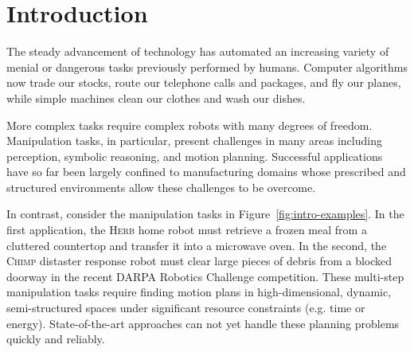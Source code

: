 \chapter{Introduction}

The steady advancement of technology
has automated an increasing variety of menial or dangerous tasks
previously performed by humans.
Computer algorithms now trade our stocks,
route our telephone calls and packages,
and fly our planes,
while simple machines clean our clothes and wash our dishes.

More complex tasks require complex robots with many
degrees of freedom.
Manipulation tasks, in particular,
present challenges in many areas including
perception, symbolic reasoning, and motion planning.
Successful applications have so far been largely
confined to manufacturing domains
whose prescribed and structured environments
allow these challenges to be overcome.

In contrast,
consider the manipulation tasks in Figure~\ref{fig:intro-examples}.
In the first application,
the \textsc{Herb} home robot must retrieve a frozen meal from 
a cluttered countertop
and transfer it into a microwave oven.
In the second,
the \textsc{Chimp} distaster response robot
must clear large pieces of debris from a blocked doorway
in the recent DARPA Robotics Challenge competition.
These multi-step manipulation tasks
require finding motion plans in
high-dimensional, dynamic, semi-structured spaces
under significant resource constraints (e.g. time or energy).
State-of-the-art approaches can not yet handle these
planning problems quickly and reliably.

